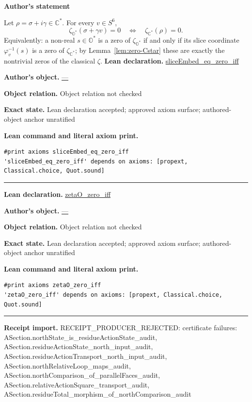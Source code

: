 \documentclass[11pt]{article}
\newcommand{\OO}{\mathbb{O}}
\newcommand{\CC}{\mathbb{C}}
\newcommand{\Ostar}{\OO^{*}}
\newcommand{\Cstar}{\CC^{*}}
\newcommand{\zetaO}{\zeta_{\Ostar}}
\newcommand{\zetaC}{\zeta_{\Cstar}}
\theoremstyle{plain}
\theoremstyle{definition}
\theoremstyle{remark}
\begin{document}
\begin{tcolorbox}[provenancecard,title={34. Theorem - Zero Equivalence Theorem},title after break={34. Theorem - Zero Equivalence Theorem (continued)}]
\textbf{Author's statement}\par
Let $\rho=\sigma+i\gamma\in\Cstar$. For every $v\in S^6$,
\[
\zetaO(\sigma+\gamma v)=0\quad\Longleftrightarrow\quad\zetaC(\rho)=0 .
\]
Equivalently: a non-real $s\in\Ostar$ is a zero of $\zetaO$ if and only if its slice
coordinate $\varphi_v^{-1}(s)$ is a zero of $\zetaC$; by Lemma~\ref{lem:zero-Cstar} these
are exactly the nontrivial zeros of the classical $\zeta$.
\tcblower
\textbf{Lean declaration.} \url{sliceEmbed_eq_zero_iff}
\par\textbf{Author's object.} \url{—}
\par\textbf{Object relation.} Object relation not checked
\par\textbf{Exact state.} Lean declaration accepted; approved axiom surface; authored-object anchor unratified
\par\smallskip\textbf{Lean command and literal axiom print.}
\begin{Verbatim}[breaklines=true,breakanywhere=true,fontsize=\small]
#print axioms sliceEmbed_eq_zero_iff
'sliceEmbed_eq_zero_iff' depends on axioms: [propext, Classical.choice, Quot.sound]
\end{Verbatim}
\medskip\hrule\medskip
\textbf{Lean declaration.} \url{zetaO_zero_iff}
\par\textbf{Author's object.} \url{—}
\par\textbf{Object relation.} Object relation not checked
\par\textbf{Exact state.} Lean declaration accepted; approved axiom surface; authored-object anchor unratified
\par\smallskip\textbf{Lean command and literal axiom print.}
\begin{Verbatim}[breaklines=true,breakanywhere=true,fontsize=\small]
#print axioms zetaO_zero_iff
'zetaO_zero_iff' depends on axioms: [propext, Classical.choice, Quot.sound]
\end{Verbatim}
\medskip\hrule\medskip
\textbf{Receipt import.} \textcolor{KgtRed}{RECEIPT\_PRODUCER\_REJECTED: certificate failures: ASection.northState\_is\_residueActionState\_audit, ASection.residueActionState\_north\_input\_audit, ASection.residueActionTransport\_north\_input\_audit, ASection.northRelativeLoop\_maps\_audit, ASection.northComparison\_of\_parallelFaces\_audit, ASection.relativeActionSquare\_transport\_audit, ASection.residueTotal\_morphism\_of\_northComparison\_audit}
\end{tcolorbox}
\end{document}
